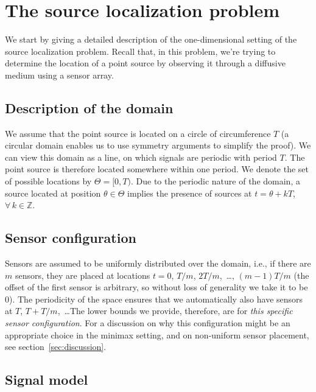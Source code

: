 \documentclass[conference]{IEEEtran}
\begin{document}
\section{The source localization problem}
\label{sec:source-localization}

We start by giving a detailed description of the one-dimensional setting of the
source localization problem. Recall that, in this problem, we're trying to
determine the location of a point source by observing it through a diffusive
medium using a sensor array.

\subsection{Description of the domain}

We assume that the point source is located on a circle of circumference $T$ (a
circular domain enables us to use symmetry arguments to simplify the proof). We
can view this domain as a line, on which signals are periodic with period $T$.
The point source is therefore located somewhere within one period. We denote
the set of possible locations by $\Theta = [0, T)$. Due to the periodic nature
of the domain, a source located at position $\theta \in \Theta$ implies the
presence of sources at $t = \theta + kT$,~$\forall \, k \in \mathbb Z$.

\subsection{Sensor configuration}

Sensors are assumed to be uniformly distributed over the domain, i.e., if there
are $m$ sensors, they are placed at locations $t = 0$, $T/m$, $2T/m$,~\dots,
$(m{-}1)T/m$ (the offset of the first sensor is arbitrary, so without loss of
generality we take it to be 0). The periodicity of the space ensures that we
automatically also have sensors at $T$, $T{+}T/m$,~\dots\@ The lower bounds we
provide, therefore, are for \emph{this specific sensor configuration}. For a
discussion on why this configuration might be an appropriate choice in the
minimax setting, and on non-uniform sensor placement, see
section~\ref{sec:discussion}.

\subsection{Signal model}
\label{sec:signal-model}
\end{document}
